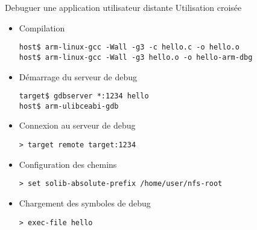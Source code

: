 \begin{frame}[fragile=singleslide]{Debuguer une application utilisateur distante}
  Utilisation croisée
  \begin{itemize}
  \item Compilation
    \begin{lstlisting}
host$ arm-linux-gcc -Wall -g3 -c hello.c -o hello.o
host$ arm-linux-gcc -Wall -g3 hello.o -o hello-arm-dbg
    \end{lstlisting}
  \item Démarrage du serveur de debug
    \begin{lstlisting}
target$ gdbserver *:1234 hello
host$ arm-ulibceabi-gdb
    \end{lstlisting}
  \item Connexion au serveur de debug
    \begin{lstlisting}
> target remote target:1234
    \end{lstlisting}
  \item Configuration des chemins
    \begin{lstlisting}
> set solib-absolute-prefix /home/user/nfs-root
    \end{lstlisting}
  \item Chargement des symboles de debug
    \begin{lstlisting}
> exec-file hello
    \end{lstlisting}  
  \end{itemize}
\end{frame}

